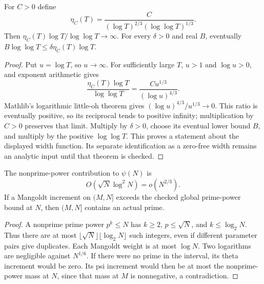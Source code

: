 \begin{lemma}
\label{construction:logarithmic-reserve}
\leanok
For $C>0$ define
\[
 \eta_C(T)=\frac{C}{(\log T)^{2/3}(\log\log T)^{1/3}}.
\]
Then $\eta_C(T)\log T/\log\log T\to\infty$.
For every $\delta>0$ and real $B$, eventually
$B\log\log T\le\delta\eta_C(T)\log T$.
\end{lemma}
\begin{proof}
Put $u=\log T$, so $u\to\infty$. For sufficiently large $T$,
$u>1$ and $\log u>0$, and exponent arithmetic gives
\[
 \frac{\eta_C(T)\log T}{\log\log T}
 =\frac{C u^{1/3}}{(\log u)^{4/3}}.
\]
Mathlib's logarithmic little-oh theorem gives
$(\log u)^{4/3}/u^{1/3}\to0$. This ratio is eventually positive,
so its reciprocal tends to positive infinity; multiplication by $C>0$
preserves that limit. Multiply by $\delta>0$, choose its eventual lower
bound $B$, and multiply by the positive $\log\log T$.
This proves a statement about the displayed width function. Its separate
identification as a zero-free width remains an analytic input until
that theorem is checked.
\end{proof}

\begin{lemma}
\label{construction:prime-powers}
\leanok
The nonprime-power contribution to $\psi(N)$ is
\[
 O(\sqrt N\log^2N)=o(N^{2/3}).
\]
If a Mangoldt increment on $(M,N]$ exceeds the checked global
prime-power bound at $N$, then $(M,N]$ contains an actual prime.
\end{lemma}
\begin{proof}
A nonprime prime power $p^k\le N$ has $k\ge2$, $p\le\sqrt N$, and
$k\le\log_2 N$.
Thus there are at most
$\lfloor\sqrt N\rfloor\lfloor\log_2N\rfloor$ such integers, even
if different parameter pairs give duplicates.
Each Mangoldt weight is at most $\log N$.
Two logarithms are negligible against $N^{1/6}$.
If there were no prime in the interval, its theta increment would be
zero.  Its psi increment would then be at most the nonprime-power
mass at $N$, since that mass at $M$ is nonnegative, a contradiction.
\end{proof}

